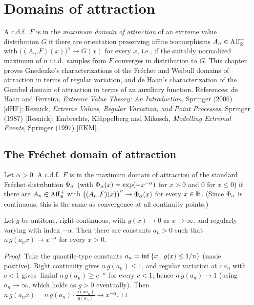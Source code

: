 \chapter{Domains of attraction}
\label{chap:domains-of-attraction}

A c.d.f.\ $F$ is in the \emph{maximum domain of attraction} of an extreme value
distribution $G$ if there are orientation preserving affine isomorphisms $A_n \in \mathrm{Aff}^+_{\mathbb{R}}$
with $\big( (A_n . F)(x) \big)^n \to G(x)$ for every $x$, i.e., if the suitably normalized
maximum of $n$ i.i.d.\ samples from $F$ converges in distribution to $G$. This chapter proves
Gnedenko's characterizations of the Fréchet and Weibull domains of attraction in terms of
regular variation, and de Haan's characterization of the Gumbel domain of attraction in terms
of an auxiliary function. References: de Haan and Ferreira, \emph{Extreme Value Theory: An
Introduction}, Springer (2006) [dHF]; Resnick, \emph{Extreme Values, Regular Variation, and
Point Processes}, Springer (1987) [Resnick]; Embrechts, Klüppelberg and Mikosch,
\emph{Modelling Extremal Events}, Springer (1997) [EKM].

\section{The Fréchet domain of attraction}

\begin{definition}
  \label{def:mda-frechet}
  \leanok
  Let $\alpha > 0$. A c.d.f.\ $F$ is in the maximum domain of attraction of the standard
  Fréchet distribution $\Phi_{\alpha}$ (with $\Phi_{\alpha}(x) = \exp(-x^{-\alpha})$
  for $x > 0$ and $0$ for $x \le 0$) if there are $A_n \in \mathrm{Aff}^+_{\mathbb{R}}$ with
  $\big( (A_n . F)(x) \big)^n \to \Phi_{\alpha}(x)$ for every $x \in \mathbb{R}$.
  (Since $\Phi_{\alpha}$ is continuous, this is the same as convergence at all
  continuity points.)
\end{definition}

\begin{lemma}
  \label{lem:frechet-exists-scaling}
  \leanok
  Let $g$ be antitone, right-continuous, with $g(x) \to 0$ as $x \to \infty$, and regularly
  varying with index $-\alpha$. Then there are constants $a_n > 0$ such that
  $n \, g(a_n x) \to x^{-\alpha}$ for every $x > 0$.
\end{lemma}
\begin{proof}
  \leanok
  Take the quantile-type constants $a_n = \inf \left\{  x \; | \; g(x) \le 1/n  \right\}$ (made positive).
  Right continuity gives $n \, g(a_n) \le 1$, and regular variation at $c \, a_n$ with $c < 1$
  gives $\liminf n \, g(a_n) \ge c^{-\alpha}$ for every $c<1$; hence $n \, g(a_n) \to 1$ (using
  $a_n \to \infty$, which holds as $g > 0$ eventually). Then
  $n \, g(a_n x) = n \, g(a_n) \cdot \frac{g(x a_n)}{g(a_n)} \to x^{-\alpha}$.
\end{proof}

